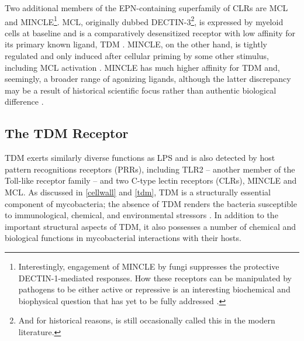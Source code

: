 Two additional members of the EPN\hyp{}containing superfamily of CLRs are MCL and MINCLE\footnote{Interestingly, engagement of MINCLE by fungi suppresses the protective DECTIN\hyp{}1\hyp{}mediated responses. How these receptors can be manipulated by pathogens to be either active or repressive is an interesting biochemical and biophysical question that has yet to be fully addressed \citep{Wevers2014}.}. MCL, originally dubbed DECTIN\hyp{}3\footnote{And for historical reasons, is still occasionally called this in the modern literature.}, is expressed by myeloid cells at baseline and is a comparatively desensitized receptor with low affinity for its primary known ligand, TDM \citep{Zhu2013, Miyake2013, Zhao2014}. MINCLE, on the other hand, is tightly regulated and only induced after cellular priming by some other stimulus, including MCL activation \citep{Wells2008, Patin2017a}. MINCLE has much higher affinity for TDM and, seemingly, a broader range of agonizing ligands, although the latter discrepancy may be a result of historical scientific focus rather than authentic biological difference \citep{Hansen2019, Richardson2014, Feinberg2016}.

\subsection{The TDM Receptor}\label{tdmreceptor}

TDM exerts similarly diverse functions as LPS and is also detected by host pattern recognitions receptors (PRRs), including TLR2 -- another member of the Toll\hyp{}like receptor family -- and two C\hyp{}type lectin receptors (CLRs), MINCLE and MCL. As discussed in \autoref{cellwall} and \autoref{tdm}, TDM is a structurally essential component of mycobacteria; the absence of TDM renders the bacteria susceptible to immunological, chemical, and environmental stressors \citep{Moliva2019, KanSutton2009, Rao2005}. In addition to the important structural aspects of TDM, it also possesses a number of chemical and biological functions in mycobacterial interactions with their hosts.

